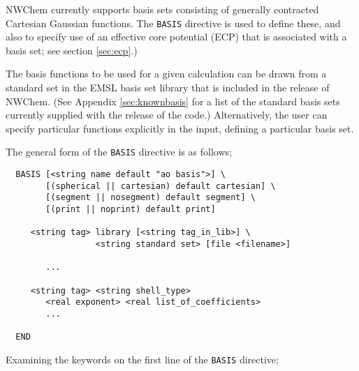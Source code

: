 \label{sec:basis} 

NWChem currently supports basis sets consisting of generally
contracted Cartesian Gaussian functions.  The {\tt BASIS} directive is
used to define these, and also to specify use of an effective core
potential (ECP) that is associated with a basis set; see section
\ref{sec:ecp}.)

The basis functions to be used for a given calculation can be drawn
from a standard set in the EMSL basis set library that is included in
the release of NWChem.  (See Appendix \ref{sec:knownbasis} for a list
of the standard basis sets currently supplied with the release of the
code.)  Alternatively, the user can specify particular functions
explicitly in the input, defining a particular basis set.

The general form of the \verb+BASIS+ directive is as follows;

\begin{verbatim}
  BASIS [<string name default "ao basis">] \
        [(spherical || cartesian) default cartesian] \
        [(segment || nosegment) default segment] \
        [(print || noprint) default print]

     <string tag> library [<string tag_in_lib>] \
                  <string standard set> [file <filename>]

        ...

     <string tag> <string shell_type>
        <real exponent> <real list_of_coefficients>
        ...
     
  END
\end{verbatim}    

Examining the keywords on the first line of the \verb+BASIS+ directive;


